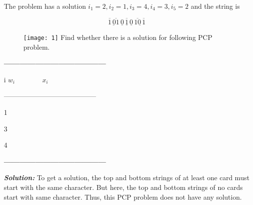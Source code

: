\documentclass[10pt,a4paper]{book}
\begin{document}
The problem has a solution $i_{1} = 2 , i_{2} = 1 , i_{3} = 4 , i_{4} = 3 , i_{5} = 2$ and the string is

$$  \underline{\overline{1}\, \overline{01}}\,
\overline{\underline{0} \, \underline{1} \, \underline{0}}\,
\underline{\overline{10} \, \overline{1}} $$

\begin{flushleft}
\begin{figure}[h]
  \texttt{[image: 1]}\; Find whether there is a solution for following PCP problem.
\end{figure}
\end{flushleft}

\begin{center}
 \textbf{\textsf{ --------------------------------------- }}

 i \qquad\qquad $w_{i} \qquad\qquad x_{i}$

 -----------------------------------------

 1 \qquad{} \qquad{}


 \; \qquad{} \qquad{}


 3 \qquad{} \qquad{}


 4 \qquad\qquad\!\! \qquad\quad\;

\textsf{\textbf{ ---------------------------------------}}
\end{center}


\begin{flushleft}
\textit{\textbf{Solution:}} To get a solution, the top and bottom strings of at least one card must start with the same character. But here, the top and bottom strings of no cards start with same character. Thus, this PCP problem does not have any solution.
\end{flushleft}
\end{document}
